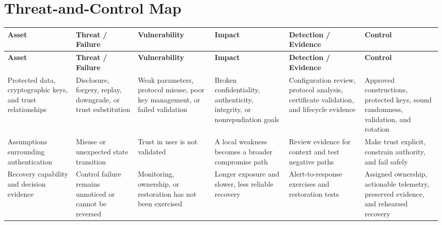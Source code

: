 \documentclass[11pt,letterpaper]{article}
\begin{document}
\section*{Threat-and-Control Map}
\begingroup\scriptsize\setlength{\tabcolsep}{2pt}
\begin{longtable}{>{\raggedright\arraybackslash}p{}>{\raggedright\arraybackslash}p{}>{\raggedright\arraybackslash}p{}>{\raggedright\arraybackslash}p{}>{\raggedright\arraybackslash}p{}>{\raggedright\arraybackslash}p{}}
\toprule\rowcolor{Navy}\color{white}\textbf{Asset} & \color{white}\textbf{Threat / Failure} & \color{white}\textbf{Vulnerability} & \color{white}\textbf{Impact} & \color{white}\textbf{Detection / Evidence} & \color{white}\textbf{Control}\\\midrule
\endfirsthead
\toprule\rowcolor{Navy}\color{white}\textbf{Asset} & \color{white}\textbf{Threat / Failure} & \color{white}\textbf{Vulnerability} & \color{white}\textbf{Impact} & \color{white}\textbf{Detection / Evidence} & \color{white}\textbf{Control}\\\midrule
\endhead
Protected data, cryptographic keys, and trust relationships & Disclosure, forgery, replay, downgrade, or trust substitution & Weak parameters, protocol misuse, poor key management, or failed validation & Broken confidentiality, authenticity, integrity, or nonrepudiation goals & Configuration review, protocol analysis, certificate validation, and lifecycle evidence & Approved constructions, protected keys, sound randomness, validation, and rotation\\\midrule
Assumptions surrounding authentication & Misuse or unexpected state transition & Trust in user is not validated & A local weakness becomes a broader compromise path & Review evidence for context and test negative paths & Make trust explicit, constrain authority, and fail safely\\\midrule
Recovery capability and decision evidence & Control failure remains unnoticed or cannot be reversed & Monitoring, ownership, or restoration has not been exercised & Longer exposure and slower, less reliable recovery & Alert-to-response exercises and restoration tests & Assigned ownership, actionable telemetry, preserved evidence, and rehearsed recovery\\\midrule
\bottomrule
\end{longtable}
\endgroup
\end{document}
